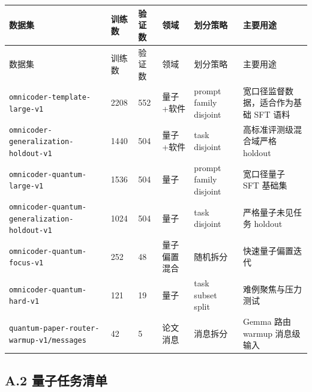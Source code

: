 \documentclass[11pt,a4paper]{article}
\newcommand{\code}[1]{\begingroup\ttfamily\footnotesize\nolinkurl{#1}\endgroup}
\begin{document}
\small
\begin{longtable}{T{2.7cm} p{1.2cm} p{1.2cm} p{2.0cm} p{2.5cm} p{4.6cm}}
\toprule
数据集 & 训练数 & 验证数 & 领域 & 划分策略 & 主要用途 \\
\midrule
\endfirsthead
\toprule
数据集 & 训练数 & 验证数 & 领域 & 划分策略 & 主要用途 \\
\midrule
\endhead
\code{omnicoder-template-large-v1} & 2208 & 552 & 量子+软件 & prompt family disjoint & 宽口径监督数据，适合作为基础 SFT 语料 \\
\code{omnicoder-generalization-holdout-v1} & 1440 & 504 & 量子+软件 & task disjoint & 高标准评测级混合域严格 holdout \\
\code{omnicoder-quantum-large-v1} & 1536 & 504 & 量子 & prompt family disjoint & 宽口径量子 SFT 基础集 \\
\code{omnicoder-quantum-generalization-holdout-v1} & 1024 & 504 & 量子 & task disjoint & 严格量子未见任务 holdout \\
\code{omnicoder-quantum-focus-v1} & 252 & 48 & 量子偏置混合 & 随机拆分 & 快速量子偏置迭代 \\
\code{omnicoder-quantum-hard-v1} & 121 & 19 & 量子 & task subset split & 难例聚焦与压力测试 \\
\code{quantum-paper-router-warmup-v1/messages} & 42 & 5 & 论文消息 & 消息拆分 & Gemma 路由 warmup 消息级输入 \\
\bottomrule
\end{longtable}
\normalsize

\subsection{A.2 量子任务清单}
\end{document}
